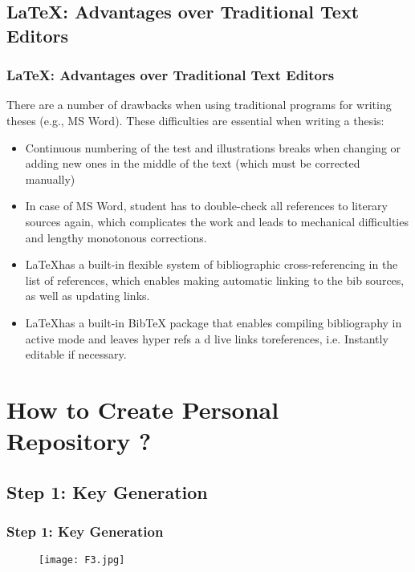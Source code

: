 \documentclass[pdflatex,compress,8pt,
	xcolor={dvipsnames,dvipsnames,svgnames,x11names,table},
	hyperref={
	breaklinks = true, 
	pdfauthor={Lemenkova Polina}, 
	pdfsubject={Preentation}, 
	pdfcreator={Lemenkova Polina}, 
	pdfproducer={Lemenkova Polina}, 
	colorlinks=true,linkcolor=blue, 
	citecolor=NavyBlue, 
	urlcolor = NavyBlue, 
	breaklinks = true}]{beamer}
\begin{document}
\subsection{\LaTeX \space : Advantages over Traditional Text Editors}
\begin{frame}\frametitle{\LaTeX \space : Advantages over Traditional Text Editors}
There are a number of drawbacks when using traditional programs for writing theses (e.g., MS Word). 
These difficulties are essential when writing a thesis:
\begin{itemize}
	\item Continuous numbering of the test and illustrations breaks when changing or adding new ones in the middle of the text (which must be corrected manually)
	\item In case of MS Word, student has to double-check all references to literary sources again, which complicates the work and leads to mechanical difficulties and lengthy monotonous corrections.
	\item \LaTeX \space has a built-in flexible system of bibliographic cross-referencing in the list of references, which enables making automatic linking to the bib sources, as well as updating links.
	\item \LaTeX \space has a built-in BibTeX package that enables compiling bibliography in active mode and leaves hyper refs a d live links toreferences, i.e. Instantly editable if necessary.
\end{itemize}
\end{frame}

\section{How to Create Personal Repository ?}
\subsection{Step 1: Key Generation}
\begin{frame}\frametitle{Step 1: Key Generation}
\begin{figure}[H]
	\centering
		\texttt{[image: F3.jpg]}
\end{figure}
\end{frame}
\end{document}
